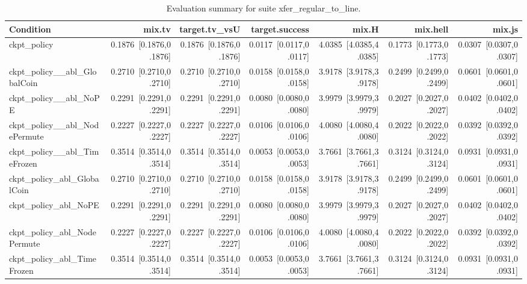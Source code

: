 \begin{table}[t]
\centering
\caption{Evaluation summary for suite xfer_regular_to_line.}
\label{tab:eval_xfer_regular_to_line}
\begin{tabular}{lrrrrrr}
\toprule
Condition & mix.tv & target.tv\_vsU & target.success & mix.H & mix.hell & mix.js \\
\midrule
ckpt\_policy & 0.1876~[0.1876,0.1876] & 0.1876~[0.1876,0.1876] & 0.0117~[0.0117,0.0117] & 4.0385~[4.0385,4.0385] & 0.1773~[0.1773,0.1773] & 0.0307~[0.0307,0.0307] \\
ckpt\_policy\_\_abl\_GlobalCoin & 0.2710~[0.2710,0.2710] & 0.2710~[0.2710,0.2710] & 0.0158~[0.0158,0.0158] & 3.9178~[3.9178,3.9178] & 0.2499~[0.2499,0.2499] & 0.0601~[0.0601,0.0601] \\
ckpt\_policy\_\_abl\_NoPE & 0.2291~[0.2291,0.2291] & 0.2291~[0.2291,0.2291] & 0.0080~[0.0080,0.0080] & 3.9979~[3.9979,3.9979] & 0.2027~[0.2027,0.2027] & 0.0402~[0.0402,0.0402] \\
ckpt\_policy\_\_abl\_NodePermute & 0.2227~[0.2227,0.2227] & 0.2227~[0.2227,0.2227] & 0.0106~[0.0106,0.0106] & 4.0080~[4.0080,4.0080] & 0.2022~[0.2022,0.2022] & 0.0392~[0.0392,0.0392] \\
ckpt\_policy\_\_abl\_TimeFrozen & 0.3514~[0.3514,0.3514] & 0.3514~[0.3514,0.3514] & 0.0053~[0.0053,0.0053] & 3.7661~[3.7661,3.7661] & 0.3124~[0.3124,0.3124] & 0.0931~[0.0931,0.0931] \\
ckpt\_policy\_abl\_GlobalCoin & 0.2710~[0.2710,0.2710] & 0.2710~[0.2710,0.2710] & 0.0158~[0.0158,0.0158] & 3.9178~[3.9178,3.9178] & 0.2499~[0.2499,0.2499] & 0.0601~[0.0601,0.0601] \\
ckpt\_policy\_abl\_NoPE & 0.2291~[0.2291,0.2291] & 0.2291~[0.2291,0.2291] & 0.0080~[0.0080,0.0080] & 3.9979~[3.9979,3.9979] & 0.2027~[0.2027,0.2027] & 0.0402~[0.0402,0.0402] \\
ckpt\_policy\_abl\_NodePermute & 0.2227~[0.2227,0.2227] & 0.2227~[0.2227,0.2227] & 0.0106~[0.0106,0.0106] & 4.0080~[4.0080,4.0080] & 0.2022~[0.2022,0.2022] & 0.0392~[0.0392,0.0392] \\
ckpt\_policy\_abl\_TimeFrozen & 0.3514~[0.3514,0.3514] & 0.3514~[0.3514,0.3514] & 0.0053~[0.0053,0.0053] & 3.7661~[3.7661,3.7661] & 0.3124~[0.3124,0.3124] & 0.0931~[0.0931,0.0931] \\
\bottomrule
\end{tabular}
\end{table}

